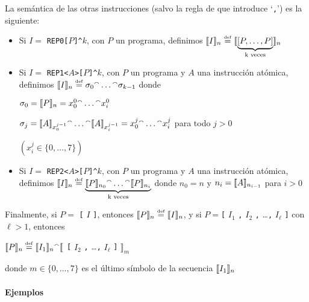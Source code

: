 La semántica de las otras instrucciones (salvo la regla de que introduce `\verb#,#') es la siguiente:
\begin{itemize}
\item Si $I=$ \verb#REP0[#$P$\verb#]^#$k$, con $P$ un programa, 
definimos 
$\llbracket I\rrbracket_n \stackrel{\scriptscriptstyle \mathrm{def}}{=} \llbracket \underbrace{[P,\dots,P]}_\text{k veces}\rrbracket_n $


\item Si $I=$ \verb#REP1<#$A$\verb#>[#$P$\verb#]^#$k$, con $P$ un programa y $A$ una instrucción atómica, 
definimos 
$\llbracket I\rrbracket_n \stackrel{\scriptscriptstyle \mathrm{def}}{=}  \sigma_0 {}^\smallfrown \dots {}^\smallfrown \sigma_{k-1}$ donde
      
      $\sigma_0 = \llbracket P\rrbracket_n = x_0^0 {}^\smallfrown \dots {}^\smallfrown x_i^0$
      
      $\sigma_j = \llbracket A\rrbracket_{x_0^{j-1}} {}^\smallfrown \dots {}^\smallfrown \llbracket A\rrbracket_{x_i^{j-1}} = x_0^j {}^\smallfrown \dots {}^\smallfrown x_i^j$ para todo $j>0$ 
      
      $(x_i^j \in\{0,\dots,7\})$

\item Si $I=$ \verb#REP2<#$A$\verb#>[#$P$\verb#]^#$k$, con $P$ un programa y $A$ una instrucción atómica, 
definimos 
$\llbracket I\rrbracket_n \stackrel{\scriptscriptstyle \mathrm{def}}{=} \underbrace{\llbracket P\rrbracket_{n_0} {}^\smallfrown \dots {}^\smallfrown \llbracket P\rrbracket_{n_i}}_\text{k veces}$ donde $n_0 = n$ y $n_i = \llbracket A\rrbracket_{n_{i-1}}$ para $i>0$ 
\end{itemize}

Finalmente, si $P=$ \verb#[# $I$ \verb#]#, entonces $\llbracket P\rrbracket_n\stackrel{\scriptscriptstyle \mathrm{def}}{=}\llbracket I\rrbracket_n$, 
y si $P=$\verb#[# $I_1$ \verb#,# $I_2$ \verb#,# \dots \verb#,# $I_\ell$ \verb#]# con $\ell>1$, entonces

\begin{center}
$\llbracket P\rrbracket_n \stackrel{\scriptscriptstyle \mathrm{def}}{=} \llbracket I_1\rrbracket_n {}^\smallfrown \llbracket$
\verb#[# $I_2$ \verb#,# \dots \verb#,# $I_\ell$ \verb#]#
$\rrbracket_m$
\end{center}

\noindent donde $m\in\{0,\dots,7\}$ es el último símbolo de la secuencia $\llbracket I_1\rrbracket_n$ 




\paragraph{Ejemplos}

